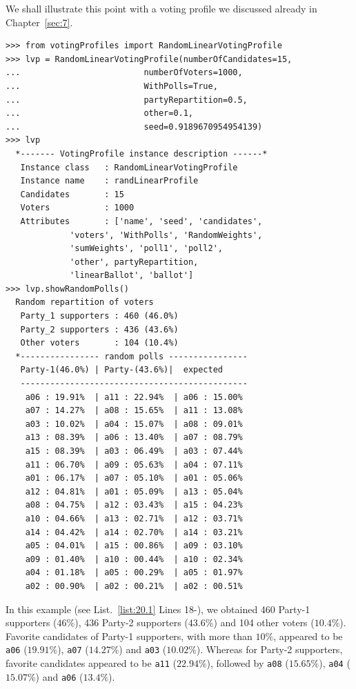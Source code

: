 We shall illustrate this point with a voting profile we discussed already in Chapter~\ref{sec:7}.
\begin{lstlisting}[caption={Example of a 3 parties voting profile},label=list:20.1]
>>> from votingProfiles import RandomLinearVotingProfile
>>> lvp = RandomLinearVotingProfile(numberOfCandidates=15,
...                         numberOfVoters=1000,
...                         WithPolls=True,
...                         partyRepartition=0.5,
...                         other=0.1,
...                         seed=0.9189670954954139)
>>> lvp
  *------- VotingProfile instance description ------*
   Instance class   : RandomLinearVotingProfile
   Instance name    : randLinearProfile
   Candidates       : 15
   Voters           : 1000
   Attributes       : ['name', 'seed', 'candidates',
             'voters', 'WithPolls', 'RandomWeights',
             'sumWeights', 'poll1', 'poll2',
             'other', partyRepartition,
             'linearBallot', 'ballot']
>>> lvp.showRandomPolls()
  Random repartition of voters
   Party_1 supporters : 460 (46.0%)
   Party_2 supporters : 436 (43.6%)
   Other voters       : 104 (10.4%)
  *---------------- random polls ----------------
   Party-1(46.0%) | Party-(43.6%)|  expected  
   ----------------------------------------------
    a06 : 19.91%  | a11 : 22.94%  | a06 : 15.00%
    a07 : 14.27%  | a08 : 15.65%  | a11 : 13.08%
    a03 : 10.02%  | a04 : 15.07%  | a08 : 09.01%
    a13 : 08.39%  | a06 : 13.40%  | a07 : 08.79%
    a15 : 08.39%  | a03 : 06.49%  | a03 : 07.44%
    a11 : 06.70%  | a09 : 05.63%  | a04 : 07.11%
    a01 : 06.17%  | a07 : 05.10%  | a01 : 05.06%
    a12 : 04.81%  | a01 : 05.09%  | a13 : 05.04%
    a08 : 04.75%  | a12 : 03.43%  | a15 : 04.23%
    a10 : 04.66%  | a13 : 02.71%  | a12 : 03.71%
    a14 : 04.42%  | a14 : 02.70%  | a14 : 03.21%
    a05 : 04.01%  | a15 : 00.86%  | a09 : 03.10%
    a09 : 01.40%  | a10 : 00.44%  | a10 : 02.34%
    a04 : 01.18%  | a05 : 00.29%  | a05 : 01.97%
    a02 : 00.90%  | a02 : 00.21%  | a02 : 00.51%
\end{lstlisting}
In this example (see List.~\vref{list:20.1} Lines 18-), we obtained 460 Party-1 supporters ($46\%$), 436 Party-2 supporters ($43.6\%$) and 104 other voters ($10.4\%$). Favorite candidates of Party-1 supporters, with more than $10\%$, appeared to be \texttt{a06} ($19.91\%$), \texttt{a07} ($14.27\%$) and \texttt{a03} ($10.02\%$). Whereas for Party-2 supporters, favorite candidates appeared to be \texttt{a11} ($22.94\%$), followed by \texttt{a08} ($15.65\%$), \texttt{a04} ($15.07\%$) and \texttt{a06} ($13.4\%$).


